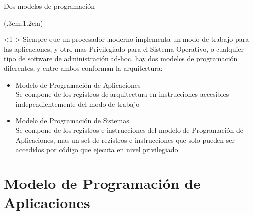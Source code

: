 \documentclass[usenames,table,dvipsnames,aspectratio=169]{beamer}
\begin{document}
\begin{frame}{Dos modelos de programación}
 \begin{textblock*}{\textwidth}(.3cm,1.2cm)
  \begin{block}<1-> \justifying
   Siempre que un procesador moderno implementa un modo de trabajo para las aplicaciones, y otro mas Privilegiado para el Sistema Operativo, o cualquier tipo de software de administración ad-hoc, hay dos modelos de programación diferentes, y entre ambos conforman la arquitectura:
   \begin{itemize}[<+(1)->]\justifying\parskip 0.3cm
    \item Modelo de Programación de Aplicaciones\\
    Se compone de los registros de arquitectura en instrucciones accesibles independientemente del modo de trabajo
    \item Modelo de Programación de Sistemas.\\
    Se compone de los registros e instrucciones del modelo de Programación de Aplicaciones, mas un set de registros e instrucciones que solo pueden ser accedidos por código que ejecuta en nivel privilegiado
   \end{itemize}
  \end{block}
 \end{textblock*}
\end{frame}

\section{Modelo de Programación de Aplicaciones}
\end{document}
